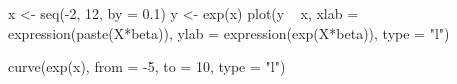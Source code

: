 \begin{Schunk}
\begin{Sinput}
 x <- seq(-2, 12, by = 0.1)
 y <- exp(x) 
 plot(y ~ x, xlab = expression(paste(X*beta)), ylab = expression(exp(X*beta)), type = "l")
\end{Sinput}
\end{Schunk}
\begin{Schunk}
\begin{Sinput}
 curve(exp(x), from = -5, to = 10, type = "l")
\end{Sinput}
\end{Schunk}

